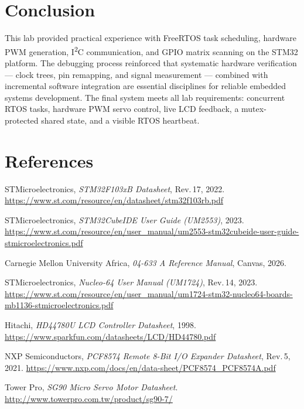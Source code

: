 \documentclass[11pt, a4paper]{article}
\begin{document}
\section*{Conclusion}

This lab provided practical experience with FreeRTOS task scheduling, hardware PWM
generation, I\textsuperscript{2}C communication, and GPIO matrix scanning on the STM32
platform. The debugging process reinforced that systematic hardware verification —
clock trees, pin remapping, and signal measurement — combined with incremental software
integration are essential disciplines for reliable embedded systems development.
The final system meets all lab requirements: concurrent RTOS tasks, hardware PWM servo
control, live LCD feedback, a mutex-protected shared state, and a visible RTOS heartbeat.

\section*{References}

\begin{enumerate}[noitemsep, topsep=2pt, label={[\arabic*]}]
  \item STMicroelectronics, \textit{STM32F103xB Datasheet}, Rev.\,17, 2022.
        \url{https://www.st.com/resource/en/datasheet/stm32f103rb.pdf}
  \item STMicroelectronics, \textit{STM32CubeIDE User Guide (UM2553)}, 2023.
        \url{https://www.st.com/resource/en/user_manual/um2553-stm32cubeide-user-guide-stmicroelectronics.pdf}
  \item Carnegie Mellon University Africa, \textit{04-633 A Reference Manual}, Canvas, 2026.
  \item STMicroelectronics, \textit{Nucleo-64 User Manual (UM1724)}, Rev.\,14, 2023.
        \url{https://www.st.com/resource/en/user_manual/um1724-stm32-nucleo64-boards-mb1136-stmicroelectronics.pdf}
  \item Hitachi, \textit{HD44780U LCD Controller Datasheet}, 1998.
        \url{https://www.sparkfun.com/datasheets/LCD/HD44780.pdf}
  \item NXP Semiconductors, \textit{PCF8574 Remote 8-Bit I/O Expander Datasheet}, Rev.\,5, 2021.
        \url{https://www.nxp.com/docs/en/data-sheet/PCF8574_PCF8574A.pdf}
  \item Tower Pro, \textit{SG90 Micro Servo Motor Datasheet}.
        \url{http://www.towerpro.com.tw/product/sg90-7/}
\end{enumerate}
\end{document}
